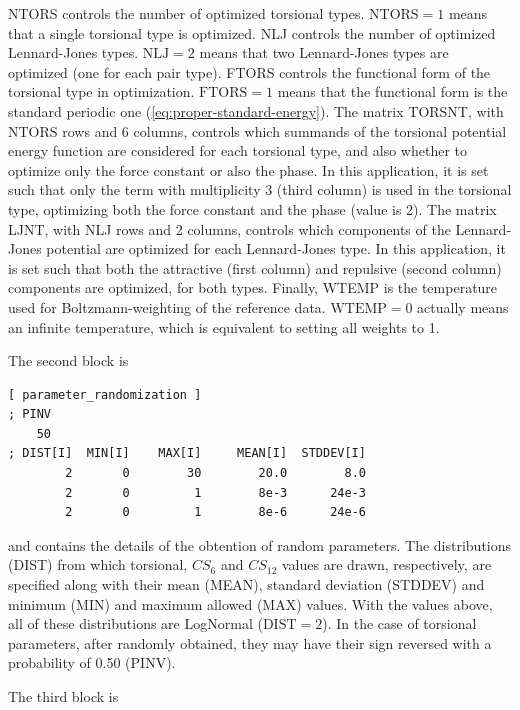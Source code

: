 \documentclass[10pt,a4paper,openany]{memoir}
\numberwithin{equation}{section}
\newcommand{\varset}[2]{$\text{#1}=#2$}
\begin{document}
\noindent
NTORS controls the number of optimized torsional types.
\varset{NTORS}{1} means that a single torsional type is optimized.
NLJ controls the number of optimized Lennard-Jones types.
\varset{NLJ}{2} means that two Lennard-Jones types are optimized (one
for each pair type).  FTORS controls the functional form of the
torsional type in optimization.  \varset{FTORS}{1} means that the
functional form is the standard periodic one
(\autoref{eq:proper-standard-energy}).  The matrix TORSNT, with NTORS
rows and 6 columns, controls which summands of the torsional potential
energy function are considered for each torsional type, and also
whether to optimize only the force constant or also the phase.  In
this application, it is set such that only the term with multiplicity
3 (third column) is used in the torsional type, optimizing both the
force constant and the phase (value is 2).  The matrix LJNT, with NLJ
rows and 2 columns, controls which components of the Lennard-Jones
potential are optimized for each Lennard-Jones type. In this
application, it is set such that both the attractive (first column)
and repulsive (second column) components are optimized, for both
types. Finally, WTEMP is the temperature used for Boltzmann-weighting
of the reference data.  \varset{WTEMP}{0} actually means an infinite
temperature, which is equivalent to setting all weights to 1.

The second block is

\begin{lstlisting}[language=gromacs]
[ parameter_randomization ]
; PINV
    50
; DIST[I]  MIN[I]    MAX[I]     MEAN[I]  STDDEV[I]
        2       0        30        20.0        8.0
        2       0         1        8e-3      24e-3
        2       0         1        8e-6      24e-6
\end{lstlisting}\vspace{2ex}\par

\noindent and contains the details of the obtention of random
parameters.
%
The distributions (DIST) from which torsional, $CS_6$ and $CS_{12}$
values are drawn, respectively, are specified along with their mean
(MEAN), standard deviation (STDDEV) and minimum (MIN) and maximum
allowed (MAX) values.
%
With the values above, all of these distributions are LogNormal
(\varset{DIST}{2}).
%
In the case of torsional parameters, after randomly obtained, they may
have their sign reversed with a probability of 0.50 (PINV).

The third block is
\end{document}
